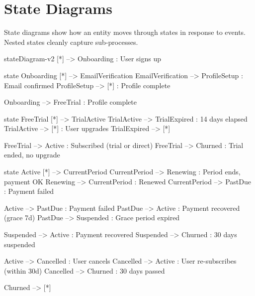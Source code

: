 \documentclass[12pt, a4paper]{article}
\begin{document}
\section{State Diagrams}

State diagrams show how an entity moves through states in
response to events.  Nested states cleanly capture sub-processes.

\begin{mermaid}[
    type    = state,
    theme   = forest,
    caption = {SaaS subscription billing state machine with nested states},
    label   = {fig:subscription},
    width   = 0.90\linewidth
]
stateDiagram-v2
    [*] --> Onboarding : User signs up

    state Onboarding {
        [*]             --> EmailVerification
        EmailVerification --> ProfileSetup : Email confirmed
        ProfileSetup    --> [*]            : Profile complete
    }

    Onboarding --> FreeTrial : Profile complete

    state FreeTrial {
        [*]          --> TrialActive
        TrialActive  --> TrialExpired : 14 days elapsed
        TrialActive  --> [*]         : User upgrades
        TrialExpired --> [*]
    }

    FreeTrial --> Active       : Subscribed (trial or direct)
    FreeTrial --> Churned      : Trial ended, no upgrade

    state Active {
        [*]        --> CurrentPeriod
        CurrentPeriod --> Renewing   : Period ends, payment OK
        Renewing   --> CurrentPeriod : Renewed
        CurrentPeriod --> PastDue    : Payment failed
    }

    Active  --> PastDue    : Payment failed
    PastDue --> Active     : Payment recovered (grace 7d)
    PastDue --> Suspended  : Grace period expired

    Suspended --> Active   : Payment recovered
    Suspended --> Churned  : 30 days suspended

    Active    --> Cancelled : User cancels
    Cancelled --> Active    : User re-subscribes (within 30d)
    Cancelled --> Churned   : 30 days passed

    Churned   --> [*]
\end{mermaid}

\end{document}
